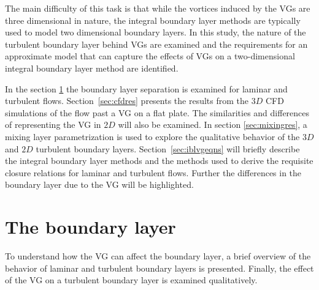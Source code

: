 The main difficulty of this task is that while the vortices induced by the VGs are three dimensional in nature, the integral boundary layer methods are typically used to model two dimensional boundary layers. In this study, the nature of the turbulent boundary layer behind VGs are examined and the requirements for an approximate model that can capture the effects of VGs on a two-dimensional integral boundary layer method are identified.%

In the section \ref{sec:blsep} the boundary layer separation is examined for laminar and turbulent flows. 
Section~\ref{sec:cfdres} presents the results from the $3D$ CFD simulations of the flow past a VG on a flat plate. The similarities and differences of representing the VG in $2D$ will also be examined.
In section \ref{sec:mixingres}, a mixing layer parametrization is used to explore the qualitative behavior of the $3D$ and $2D$ turbulent boundary layers. 
Section~\ref{sec:iblvgeqns} will briefly describe the integral boundary layer methods and the methods used to derive the requisite closure relations for laminar and turbulent flows. Further the differences in the boundary layer due to the VG will be highlighted.


\section{The boundary layer}\label{sec:blsep}

To understand how the VG can affect the boundary layer, a brief overview of the behavior of laminar and turbulent boundary layers is presented. Finally, the effect of the VG on a turbulent boundary layer is examined qualitatively.

